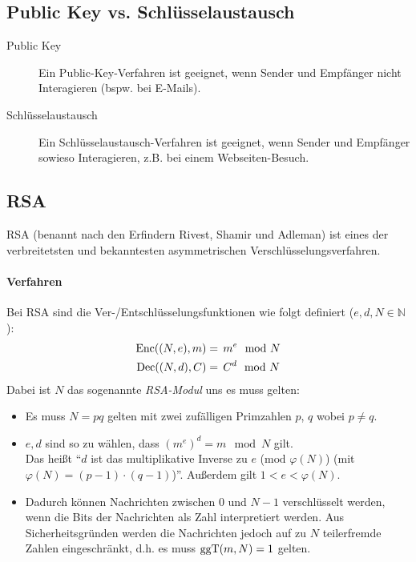 	\subsection{Public Key vs. Schlüsselaustausch}
		\begin{description}
			\item[Public Key] Ein Public-Key-Verfahren ist geeignet, wenn Sender und Empfänger nicht Interagieren (bspw. bei E-Mails).
			\item[Schlüsselaustausch] Ein Schlüsselaustausch-Verfahren ist geeignet, wenn Sender und Empfänger sowieso Interagieren, z.B. bei einem Webseiten-Besuch.
		\end{description}

	\subsection{RSA}
		RSA (benannt nach den Erfindern Rivest, Shamir und Adleman) ist eines der verbreitetsten und bekanntesten asymmetrischen Verschlüsselungsverfahren.

		\paragraph{Verfahren}
			Bei RSA sind die Ver-/Entschlüsselungsfunktionen wie folgt definiert (\( e, d, N \in \mathbb{N} \)):
			\begin{align*}
				\operatorname{Enc}((N, e), m) & =\, m ^ e \mod N \\
				\operatorname{Dec}((N, d), C) & =\, C ^ d \mod N
			\end{align*}
			Dabei ist \(N\) das sogenannte \textit{RSA-Modul} uns es muss gelten:
			\begin{itemize}
				\item Es muss \( N = pq \) gelten mit zwei zufälligen Primzahlen \( p \), \( q \) wobei \( p \neq q \).
				\item \( e, d \) sind so zu wählen, dass \( (m ^ e) ^ d = m \mod N \) gilt. \\ Das heißt \enquote{\(d\) ist das multiplikative Inverse zu \( e \) (\( \textrm{mod } \varphi(N) \)) (mit \( \varphi(N) = (p - 1) \cdot (q - 1) \))}. Außerdem gilt \( 1 < e < \varphi(N) \).
				\item Dadurch können Nachrichten zwischen \( 0 \) und \( N - 1 \) verschlüsselt werden, wenn die Bits der Nachrichten als Zahl interpretiert werden. Aus Sicherheitsgründen werden die Nachrichten jedoch auf zu \(N\) teilerfremde Zahlen eingeschränkt, d.h. es muss \( \textrm{ggT}(m, N) = 1 \) gelten.
			\end{itemize}

